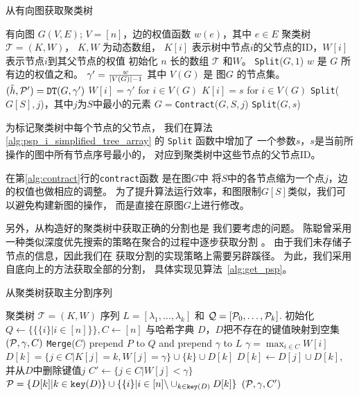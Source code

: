 \begin{algorithm}[!ht]
	\caption{从有向图获取聚类树}\label{alg:psp_i_simplified_tree_array}
	\begin{algorithmic}[1]
		\REQUIRE 有向图 $G(V, E)$; $V=[n]$，边的权值函数 $w(e)$，其中 $e\in E$
		\ENSURE 聚类树 $\mathcal{T}=(K, W)$， $K,W$ 为动态数组，
    $K[i]$ 表示树中节点$i$的父节点的ID，$W[i]$表示节点$i$到其父节点的权值
		\STATE 初始化 $n$ 长的数组 $\mathcal{T}$
     和$W$。
		\STATE \texttt{Split}($G, 1$)
		\STATE $w$ 是 $G$ 所有边的权值之和。
		\STATE $\gamma' = \frac{w}{\abs{V(G)}-1}$
    其中 $V(G)$ 是 图$G$
    的节点集。
		\STATE $(\tilde{h}, \P')
    = \texttt{DT}(G, \gamma')$ 
		\STATE $W[i]=\gamma'$ for $ i \in V(G)$
    \STATE $K[i]=s$ for $i\in V(G)$
    \ELSE
		\STATE \texttt{Split}($G[S], j$)，其中$j$为$S$中最小的元素
		\STATE $G=$\texttt{Contract}($G, S, j$) \label{alg:contract}
    \ENDFOR 
		\STATE \texttt{Split}($G, s$)
		\ENDIF
		\ENDFUNCTION
	\end{algorithmic}
\end{algorithm}

为标记聚类树中每个节点的父节点，
我们在算法\ref{alg:psp_i_simplified_tree_array}
的 \texttt{Split} 函数中增加了
一个参数$s$，$s$是当前所操作的图中所有节点序号最小的，
对应到聚类树中这些节点的父节点ID。

在第\ref{alg:contract}行的\texttt{contract}函数 是在图$G$中
将$S$中的各节点缩为一个点$j$，边的权值也做相应的调整。
为了提升算法运行效率，和图限制$G[S]$类似，我们可以避免构建新图的操作，
而是直接在原图$G$上进行修改。

另外，从构造好的聚类树中获取正确的分割也是
我们要考虑的问题。
陈聪曾采用一种类似深度优先搜索的策略在聚合的过程中逐步获取分割
\cite{chan2020agglomerative}。
由于我们未存储子节点的信息，因此我们在
获取分割的实现策略上需要另辟蹊径。
为此，我们采用自底向上的方法获取全部的分割，
具体实现见算法~\ref{alg:get_psp}。

\begin{algorithm}[!ht]
	\caption{从聚类树获取主分割序列}\label{alg:get_psp}
	\begin{algorithmic}[1]
		\REQUIRE 聚类树 $\mathcal{T}=(K, W)$
		\ENSURE 序列 $L=[\lambda_1, \dots, \lambda_k]$
    和 $\mathcal{Q}=[\P_0, \dots, \P_k]$.
    \STATE 初始化 $Q\leftarrow \{ \{\{i\}|i\in [n]\} \}, C\leftarrow [n]$ 与哈希字典 $D$，$D$把不存在的键值映射到空集
		\STATE $(\P,\gamma, C)$ \leftarrow \texttt{Merge}($C$)
    \STATE prepend $P$ to $Q$ and prepend $\gamma$ to $L$
    \ENDWHILE
    \STATE $\gamma = \max_{i\in C} W[i]$
    \STATE $D[k] = \{ j\in C | K[j] = k, W[j]=\gamma\} \cup \{k\} \cup D[k]$
    \STATE $D[k] \leftarrow D[j] \cup D[k]$, 并从$D$中删除键值$j$ 
    \ENDFOR
    \STATE $C' \leftarrow  \{j\in C | W[j]<\gamma\}$
    \STATE $\P=\{D[k] | k \in \texttt{key}(D)\} \cup \{\{i\} | i \in [n]\backslash \cup_{k \in \texttt{key}(D)} D[k] \}$
    \RETURN $(\P, \gamma, C')$
		\ENDFUNCTION
	\end{algorithmic}
\end{algorithm}

